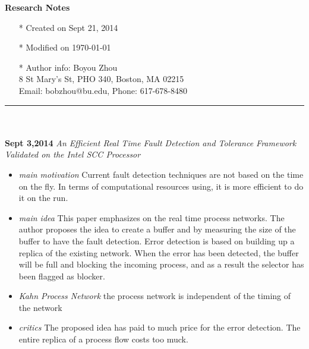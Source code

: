 \documentclass[]{article}
\begin{document}
\pagestyle{empty}
{\large\textbf{Research Notes}}
\begin{itemize}
    \item[*] Created on Sept 21, 2014
    \item[*] Modified on \today
    \item[*] Author info: Boyou Zhou\\
             8 St Mary's St, PHO 340, Boston, MA 02215\\
             Email: bobzhou@bu.edu, Phone: 617-678-8480
\end{itemize}


\rule[-0.1cm]{7.5in}{0.01cm}\\
\\
\noindent \textbf{Sept 3,2014}
\textit{An Efficient Real Time Fault Detection and Tolerance Framework Validated on the Intel SCC Processor}
\indent		\begin{itemize}
            \item \textit{main motivation} Current fault detection techniques are not based on the time on the fly.
            In terms of computational resources using, it is more efficient to do it on the run. 

            \item \textit{main idea} This paper emphasizes on the real time process networks. The author proposes the
            idea to create a buffer and by measuring the size of the buffer to have the fault detection.
            Error detection is based on building up a replica of the existing network.
            When the error has been detected, the buffer will be full and blocking the incoming process, and as a result
            the selector has been flagged as blocker.

            \item \textit{Kahn Process Network} the process network is independent of the timing of the network

            \item \textit{critics} The proposed idea has paid to much price for the error detection. The entire replica
            of a process flow costs too muck.

        \end{itemize}
\end{document}
